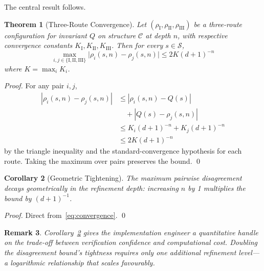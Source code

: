 \documentclass[twocolumn,11pt,a4paper]{article}
\newtheorem{theorem}{Theorem}[section]
\newtheorem{corollary}[theorem]{Corollary}
\newtheorem{remark}[theorem]{Remark}
\newcommand{\Inv}{Q}
\newcommand{\Route}{\rho}
\newcommand{\RouteI}{\rho_{\mathrm{I}}}
\newcommand{\RouteII}{\rho_{\mathrm{II}}}
\newcommand{\RouteIII}{\rho_{\mathrm{III}}}
\newcommand{\StateS}{\mathcal{S}}
\newcommand{\Depth}{n}
\newcommand{\Dim}{d}
\newcommand{\Tolb}{K}
\begin{document}
The central result follows.

\begin{theorem}[Three-Route Convergence]
\label{thm:convergence}
Let $(\RouteI, \RouteII, \RouteIII)$ be a three-route configuration for invariant $\Inv$ on structure $\mathcal{C}$ at depth $\Depth$, with respective convergence constants $\Tolb_{\mathrm{I}}, \Tolb_{\mathrm{II}}, \Tolb_{\mathrm{III}}$. Then for every $s \in \StateS$,
\begin{equation}
\max_{i, j \in \{\mathrm{I}, \mathrm{II}, \mathrm{III}\}} \bigl|\Route_i(s, \Depth) - \Route_j(s, \Depth)\bigr| \leq 2\Tolb(\Dim+1)^{-\Depth}
\label{eq:convergence}
\end{equation}
where $\Tolb = \max_i \Tolb_i$.
\end{theorem}

\begin{proof}
For any pair $i, j$,
\begin{align*}
|\Route_i(s, \Depth) - \Route_j(s, \Depth)|
&\leq |\Route_i(s, \Depth) - \Inv(s)| \\
&\quad + |\Inv(s) - \Route_j(s, \Depth)| \\
&\leq \Tolb_i(\Dim+1)^{-\Depth} + \Tolb_j(\Dim+1)^{-\Depth} \\
&\leq 2\Tolb(\Dim+1)^{-\Depth}
\end{align*}
by the triangle inequality and the standard-convergence hypothesis for each route. Taking the maximum over pairs preserves the bound. \qed
\end{proof}

\begin{corollary}[Geometric Tightening]
\label{cor:tightening}
The maximum pairwise disagreement decays geometrically in the refinement depth: increasing $\Depth$ by 1 multiplies the bound by $(\Dim+1)^{-1}$.
\end{corollary}

\begin{proof}
Direct from~\eqref{eq:convergence}. \qed
\end{proof}

\begin{remark}
Corollary~\ref{cor:tightening} gives the implementation engineer a quantitative handle on the trade-off between verification confidence and computational cost. Doubling the disagreement bound's tightness requires only one additional refinement level---a logarithmic relationship that scales favourably.
\end{remark}

\end{document}
